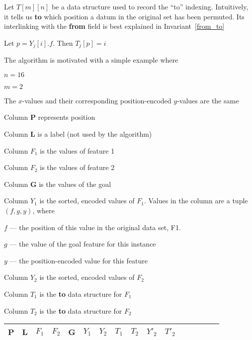 \documentclass[12pt,letterpaper]{article}
\begin{document}
\item Let \(T[m][n]\) be a data structure used to record the ``to'' indexing.
  Intuitively, it tells us {\bf to} which position a datum in the original set
  has been permuted. Its interlinking with the {\bf from} field is best explained
  in Invariant~\ref{from_to}
  \ee

\begin{invariant}
  \label{from_to}
  Let \(p = Y_j[i].f\). Then \(T_j[p] = i\)

\end{invariant}

The algorithm is motivated with a simple example where
\be
\item \(n= 16\)
\item \(m= 2\)
\item The \(x\)-values and their corresponding position-encoded \(y\)-values are the same
\item Column {\bf P} represents position
\item Column {\bf L} is a label (not used by the algorithm)
\item Column \(F_1\) is the values of feature 1 
\item Column \(F_2\) is the values of feature 2
\item Column {\bf G} is the values of the goal
\item Column \(Y_1\) is the sorted, encoded values of \(F_1\). Values in the column
  are a tuple \((f,g,y)\), where 
  \be
\item \(f\) --- the position of this value in the original data set, F1.
\item \(g\) --- the value of the goal feature for this instance
\item \(y\) --- the position-encoded value for this feature
  \ee
\item Column \(Y_2\) is the sorted, encoded values of \(F_2\)
\item Column \(T_1\) is the {\bf to} data structure for \(F_1\)
\item Column \(T_2\) is the {\bf to} data structure for \(F_2\)
  \ee

  \begin{table}
    \begin{tabular}{|l|l|l|l|l|l|l|l|l|l|l|l|l|l|l|l|} \hline \hline
      {\bf P} & {\bf L} & \(F_1\) & \(F_2\) & {\bf G} & \(Y_1\) &  %
      \(Y_2\) & \(T_1\) & \(T_2\) & \(Y'_2\) & \(T'_2\) \\ \hline \hline
      
      \hline
    \end{tabular}
  \end{table}
\end{document}
